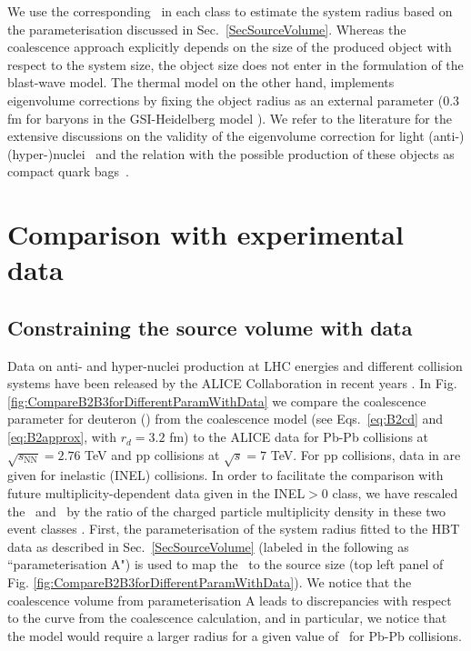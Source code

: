 We use the corresponding \avdNdeta~in each class to estimate the system radius based on the parameterisation discussed in Sec.~\ref{SecSourceVolume}. 
Whereas the coalescence approach
explicitly depends on the size of the produced object with respect to the system size, the object size does not enter in the formulation of the blast-wave model.
The thermal model on the other hand, implements eigenvolume corrections by fixing the object radius as an external parameter %
(0.3 fm for baryons in the GSI-Heidelberg model \cite{Andronic:2017}).
 We refer to the literature for the extensive discussions on the validity of the eigenvolume correction for light (anti-)(hyper-)nuclei~\cite{Vovchenko:2016mwg} and the relation with the possible production of these objects as compact quark bags~\cite{Andronic:2017}.


\section{Comparison with experimental data}\label{sec:comparison}

\subsection{Constraining the source volume with data}\label{sec:radiiParamet}

Data on anti- and hyper-nuclei production at LHC energies and different collision systems have been released by the ALICE Collaboration in recent years \cite{ALICE:nucleipp2017,ALICE:deuteronppPbPb2015,Acharya:2017dmc, Adam:2015yta}. 
In Fig. \ref{fig:CompareB2B3forDifferentParamWithData} we compare the coalescence parameter for deuteron (\btwo) from the coalescence model (see Eqs.~\ref{eq:B2cd} and \ref{eq:B2approx}, with $r_{d} = 3.2$ fm) to the ALICE data for Pb-Pb collisions at $\sqrt{s_{\mathrm{NN}}} = 2.76$ TeV and pp collisions at $\sqrt{s} = 7$ TeV. For pp collisions, data in  \cite{ALICE:nucleipp2017} are given for inelastic (INEL) collisions. In order to facilitate the comparison with future multiplicity-dependent data given in the INEL$>$0 class, we have rescaled the \btwo~and \bthree~by the ratio of the charged particle multiplicity density in these two event classes \cite{Adam:2015gka}.
First, the parameterisation of the system radius fitted to the HBT data as described in Sec.~\ref{SecSourceVolume} (labeled in the following as ``parameterisation A") is used to map the \avdNdeta~to the source size (top left panel of Fig. \ref{fig:CompareB2B3forDifferentParamWithData}). 
We notice that the coalescence volume from parameterisation A leads to discrepancies with respect to the curve from the coalescence calculation, and in particular, we notice that the model would require a larger radius for a given value of \btwo~for Pb-Pb collisions.

